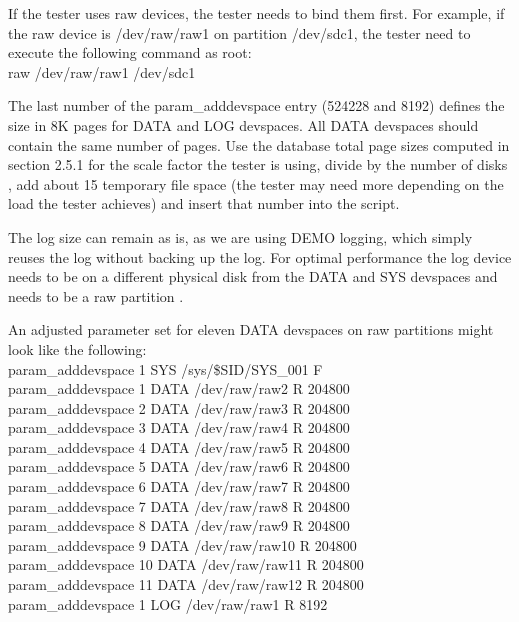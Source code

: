 \documentclass{article}
\begin{document}
\noindent
If the tester uses raw devices, the tester needs to bind them first.
For example, if the raw device is /dev/raw/raw1 on partition
/dev/sdc1, the tester need to execute the following command as root: \\
\indent raw /dev/raw/raw1 /dev/sdc1

\noindent
The last number of the param\_adddevspace entry (524228 and 8192)
defines the size in 8K pages for DATA and LOG devspaces.  All DATA
devspaces should contain  the same number of pages.  Use the database
total page sizes computed in section 2.5.1 for the scale factor the
tester is using, divide by the number of disks , add about 15%
temporary file space (the tester may need more depending on the load
the tester achieves) and insert that number into the script.  

\noindent
The log size can remain as is, as we are using DEMO logging, which
simply reuses the log without backing up the log.  For optimal
performance the log device needs to be on a different physical disk
from the DATA and SYS devspaces and needs to be a raw partition .

\noindent
An adjusted parameter set for eleven DATA devspaces on raw partitions
might look like the following: \\
\indent param\_adddevspace 1 SYS  /sys/\$SID/SYS\_001   F \\
\indent param\_adddevspace 1 DATA /dev/raw/raw2 R 204800 \\
\indent param\_adddevspace 2 DATA /dev/raw/raw3 R 204800 \\
\indent param\_adddevspace 3 DATA /dev/raw/raw4 R 204800 \\
\indent param\_adddevspace 4 DATA /dev/raw/raw5 R 204800 \\
\indent param\_adddevspace 5 DATA /dev/raw/raw6 R 204800 \\
\indent param\_adddevspace 6 DATA /dev/raw/raw7 R 204800 \\
\indent param\_adddevspace 7 DATA /dev/raw/raw8 R 204800 \\
\indent param\_adddevspace 8 DATA /dev/raw/raw9 R 204800 \\
\indent param\_adddevspace 9 DATA /dev/raw/raw10 R 204800 \\
\indent param\_adddevspace 10 DATA /dev/raw/raw11 R 204800 \\
\indent param\_adddevspace 11 DATA /dev/raw/raw12 R 204800 \\
\indent param\_adddevspace 1 LOG  /dev/raw/raw1 R 8192
\end{document}

